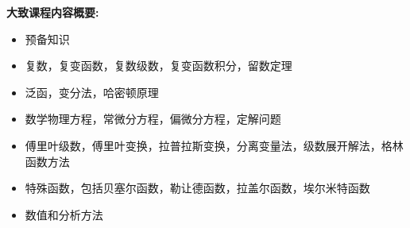\documentclass[11pt,a4paper]{article}
\begin{document}
\noindent \textbf{大致课程内容概要:}
\begin{center} 
	\begin{itemize}
		\item 预备知识
		\item 复数，复变函数，复数级数，复变函数积分，留数定理
		\item 泛函，变分法，哈密顿原理
		\item 数学物理方程，常微分方程，偏微分方程，定解问题
		\item 傅里叶级数，傅里叶变换，拉普拉斯变换，分离变量法，级数展开解法，格林函数方法
		\item 特殊函数，包括贝塞尔函数，勒让德函数，拉盖尔函数，埃尔米特函数
		\item 数值和分析方法
	\end{itemize}

\end{center}
\end{document}
